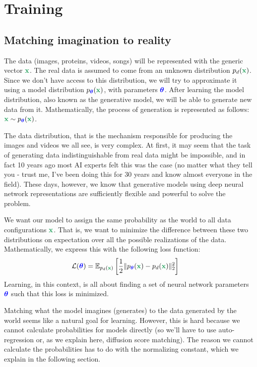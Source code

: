 \documentclass[usenames,dvipsnames]{article}
\DeclarePairedDelimiter{\norm}{\lVert}{\rVert}
\newcommand{\myvec}[1]{\mathbf{#1}}
\newcommand{\myvecsym}[1]{\boldsymbol{#1}}
\newcommand{\vx}{\myvec{\textcolor{ForestGreen}{x}}}
\newcommand{\vtheta}{\myvecsym{\textcolor{blue}{\theta}}}
\newcommand{\loss}{{\cal L}}
\newcommand{\E}{\mathbb{E}} %
\newcommand{\pT}{p_{\vtheta}}
\begin{document}
\section{Training}
\subsection{Matching imagination to reality}

The data (images, proteins, videos, songs) will be represented with the generic vector $\vx$. The real data is assumed to come from an unknown distribution $p_d(\vx)$. Since we don't have access to this distribution, we will try to approximate it using a model distribution $\pT(\vx)$, with parameters $\vtheta$. After learning the model distribution, also known as the generative model, we will be able to generate new data from it. Mathematically, the process of generation is represented as follows: $\vx \sim \pT(\vx)$.

The data distribution, that is the mechanism responsible for producing the images and videos we all see, is very complex. At first, it may seem that the task of generating data indistinguishable from real data might be impossible, and in fact 10 years ago most AI experts felt this was the case (no matter what they tell you - trust me, I've been doing this for 30 years and know almost everyone in the field). These days, however, we know that generative models using deep neural network representations are sufficiently flexible and powerful to solve the problem.


We want our model to assign the same probability as the world to all data configurations $\vx$. That is, we want to minimize the difference between these two distributions on expectation over all the possible realizations of the data. Mathematically, we express this with the following loss function:
\begin{align}
  \loss(\vtheta)
  &= \E_{p_{d}(\vx)} \left[ \frac{1}{2}
    \norm{  \pT(\vx)
      -  p_{d}(\vx)}_2^2  \right]
\end{align}
Learning, in this context, is all about finding a set of neural network parameters $\vtheta$ such that this loss is minimized.

Matching what the model imagines (generates) to the data generated by the world seems like a natural goal for learning. However, this is hard because we cannot calculate probabilities for models directly (so we'll have to use auto-regression or, as we explain here, diffusion score matching). The reason we cannot calculate the probabilities has to do with the normalizing constant, which we explain in the following section.
\end{document}
